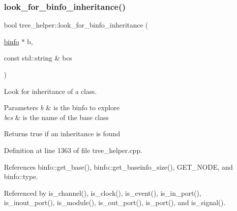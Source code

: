 \subsubsection{\texorpdfstring{look\+\_\+for\+\_\+binfo\+\_\+inheritance()}{look\_for\_binfo\_inheritance()}}
{\footnotesize\ttfamily bool tree\+\_\+helper\+::look\+\_\+for\+\_\+binfo\+\_\+inheritance (\begin{DoxyParamCaption}\item[{\hyperlink{structbinfo}{binfo} $\ast$}]{b,  }\item[{const std\+::string \&}]{bcs }\end{DoxyParamCaption})\hspace{0.3cm}{\ttfamily [static]}}



Look for inheritance of a class. 


\begin{DoxyParams}{Parameters}
{\em b} & is the binfo to explore \\
\hline
{\em bcs} & is the name of the base class \\
\hline
\end{DoxyParams}
\begin{DoxyReturn}{Returns}
true if an inheritance is found 
\end{DoxyReturn}


Definition at line 1363 of file tree\+\_\+helper.\+cpp.



References binfo\+::get\+\_\+base(), binfo\+::get\+\_\+baseinfo\+\_\+size(), G\+E\+T\+\_\+\+N\+O\+DE, and binfo\+::type.



Referenced by is\+\_\+channel(), is\+\_\+clock(), is\+\_\+event(), is\+\_\+in\+\_\+port(), is\+\_\+inout\+\_\+port(), is\+\_\+module(), is\+\_\+out\+\_\+port(), is\+\_\+port(), and is\+\_\+signal().


